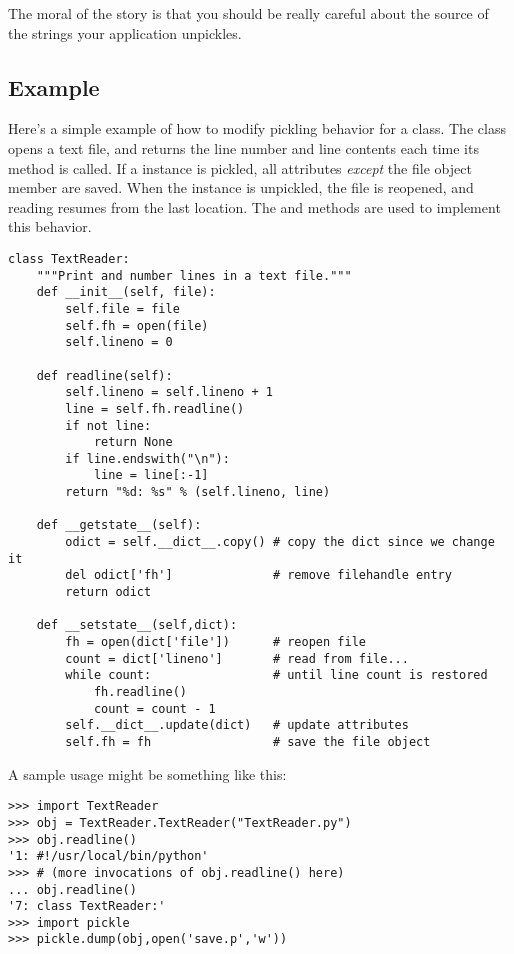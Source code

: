 The moral of the story is that you should be really careful about the
source of the strings your application unpickles.

\subsection{Example \label{pickle-example}}

Here's a simple example of how to modify pickling behavior for a
class.  The  class opens a text file, and returns
the line number and line contents each time its 
method is called. If a  instance is pickled, all
attributes \emph{except} the file object member are saved. When the
instance is unpickled, the file is reopened, and reading resumes from
the last location. The  and
 methods are used to implement this behavior.

\begin{verbatim}
class TextReader:
    """Print and number lines in a text file."""
    def __init__(self, file):
        self.file = file
        self.fh = open(file)
        self.lineno = 0

    def readline(self):
        self.lineno = self.lineno + 1
        line = self.fh.readline()
        if not line:
            return None
        if line.endswith("\n"):
            line = line[:-1]
        return "%d: %s" % (self.lineno, line)

    def __getstate__(self):
        odict = self.__dict__.copy() # copy the dict since we change it
        del odict['fh']              # remove filehandle entry
        return odict

    def __setstate__(self,dict):
        fh = open(dict['file'])      # reopen file
        count = dict['lineno']       # read from file...
        while count:                 # until line count is restored
            fh.readline()
            count = count - 1
        self.__dict__.update(dict)   # update attributes
        self.fh = fh                 # save the file object
\end{verbatim}

A sample usage might be something like this:

\begin{verbatim}
>>> import TextReader
>>> obj = TextReader.TextReader("TextReader.py")
>>> obj.readline()
'1: #!/usr/local/bin/python'
>>> # (more invocations of obj.readline() here)
... obj.readline()
'7: class TextReader:'
>>> import pickle
>>> pickle.dump(obj,open('save.p','w'))
\end{verbatim}

